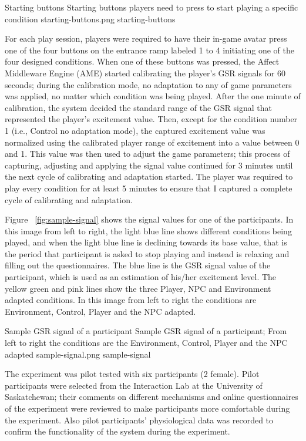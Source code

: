 \largeimg
{Starting buttons}
{Starting buttons players need to press to start playing a specific condition}
{starting-buttons.png}
{starting-buttons}

For each play session, players were required to have their in-game avatar press one of the four buttons on the entrance ramp labeled 1 to 4 initiating one of the four designed conditions. When one of these buttons was pressed, the Affect Middleware Engine (AME) started calibrating the player's GSR signals for 60 seconds; during the calibration mode, no adaptation to any of game parameters was applied, no matter which condition was being played. After the one minute of calibration, the system decided the standard range of the GSR signal that represented the player's excitement value. Then, except for the condition number 1 (i.e., Control no adaptation mode), the captured excitement value was normalized using the calibrated player range of excitement into a value between 0 and 1. This value was then used to adjust the game parameters; this process of capturing, adjusting and applying the signal value continued for 3 minutes until the next cycle of calibrating and adaptation started. The player was required to play every condition for at least 5 minutes to ensure that I captured a complete cycle of calibrating and adaptation.

Figure ~\ref{fig:sample-signal} shows the signal values for one of the participants. In this image from left to right, the light blue line shows different conditions being played, and when the light blue line is declining towards its base value, that is the period that participant is asked to stop playing and instead is relaxing and filling out the questionnaires. The blue line is the GSR signal value of the participant, which is used as an estimation of his/her excitement level. The yellow green and pink lines show the three Player, NPC and Environment adapted conditions. In this image from left to right the conditions are Environment, Control, Player and the NPC adapted.

\largeimg
{Sample GSR signal of a participant}
{Sample GSR signal of a participant; From left to right the conditions are the Environment, Control, Player and the NPC adapted}
{sample-signal.png}
{sample-signal}

The experiment was pilot tested with six participants (2 female). Pilot participants were selected from the Interaction Lab at the University of Saskatchewan; their comments on different mechanisms and online questionnaires of the experiment were reviewed to make participants more comfortable during the experiment. Also pilot participants' physiological data was recorded to confirm the functionality of the system during the experiment.

